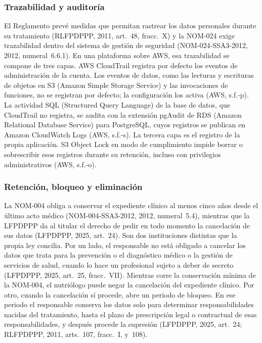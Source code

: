 \documentclass[12pt, a4paper]{article}
\begin{document}
\subsubsection{Trazabilidad y auditoría}
 
El Reglamento prevé medidas que permitan rastrear los datos
personales durante su tratamiento (RLFPDPPP, 2011, art.~48,
fracc.~X) y la NOM-024 exige trazabilidad dentro del sistema de
gestión de seguridad (NOM-024-SSA3-2012, 2012, numeral~6.6.1). En
una plataforma sobre AWS, esa trazabilidad se compone de tres capas. AWS CloudTrail
registra por defecto los eventos de administración de la cuenta. Los
eventos de datos, como las lecturas y escrituras de objetos en S3 (Amazon Simple Storage Service) y las
invocaciones de funciones, no se registran por defecto; la
configuración los activa (AWS, s.f.-p). La
actividad SQL (Structured Query Language) de la base de datos, que CloudTrail no registra, se
audita con la extensión pgAudit de RDS (Amazon Relational Database Service) para PostgreSQL, cuyos registros se publican en Amazon CloudWatch Logs (AWS, s.f.-s).
La tercera capa es
el registro de la propia aplicación. S3 Object Lock en modo de
cumplimiento impide borrar o sobrescribir esos registros durante su
retención, incluso con privilegios administrativos (AWS, s.f.-o).
 
\subsubsection{Retención, bloqueo y eliminación}
 
La NOM-004 obliga a conservar el expediente clínico al menos cinco
años desde el último acto médico (NOM-004-SSA3-2012, 2012,
numeral~5.4), mientras que la LFPDPPP da al titular el derecho de
pedir en todo momento la cancelación de sus datos (LFPDPPP, 2025,
art.~24). Son dos instituciones distintas que la propia ley concilia.
Por un lado, el responsable no está obligado a cancelar los datos que
trata para la prevención o el diagnóstico médico o la gestión de
servicios de salud, cuando lo hace un profesional sujeto a deber de
secreto (LFPDPPP, 2025, art.~25, fracc.~VII). Mientras corre la
conservación mínima de la NOM-004, el nutriólogo puede negar la
cancelación del expediente clínico. Por otro, cuando la cancelación sí
procede, abre un periodo de bloqueo. En ese periodo el responsable
conserva los datos solo para determinar responsabilidades nacidas del
tratamiento, hasta el plazo de prescripción legal o contractual de esas
responsabilidades, y después procede la supresión (LFPDPPP, 2025,
art.~24; RLFPDPPP, 2011, arts.~107, fracc.~I, y~108).
 
\end{document}
